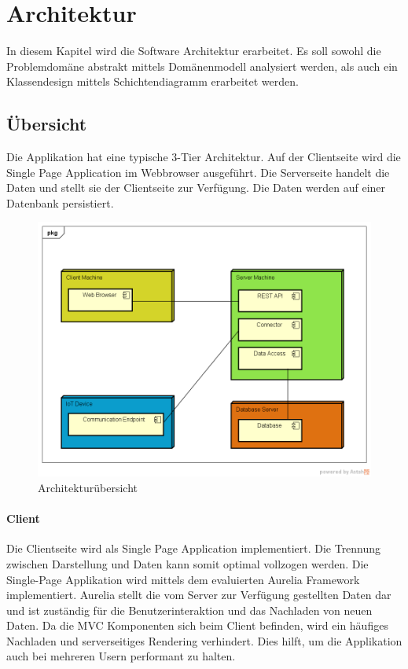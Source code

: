  \chapter{Architektur}
In diesem Kapitel wird die Software Architektur erarbeitet.  
Es soll sowohl die Problemdomäne abstrakt mittels Domänenmodell analysiert werden, als auch ein Klassendesign mittels Schichtendiagramm erarbeitet werden.

\section{Übersicht}
Die Applikation hat eine typische 3-Tier Architektur. Auf der Clientseite wird die Single Page Application im Webbrowser ausgeführt. Die Serverseite handelt die Daten und stellt sie der Clientseite zur Verfügung. Die Daten werden auf einer Datenbank persistiert.
\begin{figure}[H]
\center
\includegraphics[scale=0.6]{../03_Design/images/architekturuebersicht}\caption{Architekturübersicht}
\end{figure}
\subsubsection{Client}
Die Clientseite wird als Single Page Application implementiert. Die Trennung zwischen Darstellung und Daten kann somit optimal vollzogen werden. Die Single-Page Applikation wird mittels dem evaluierten Aurelia Framework implementiert. Aurelia stellt die vom Server zur Verfügung gestellten Daten dar und ist zuständig für die Benutzerinteraktion und das Nachladen von neuen Daten. Da die MVC Komponenten sich beim Client befinden, wird ein häufiges Nachladen und serverseitiges Rendering verhindert. Dies hilft, um die Applikation auch bei mehreren Usern performant zu halten.
